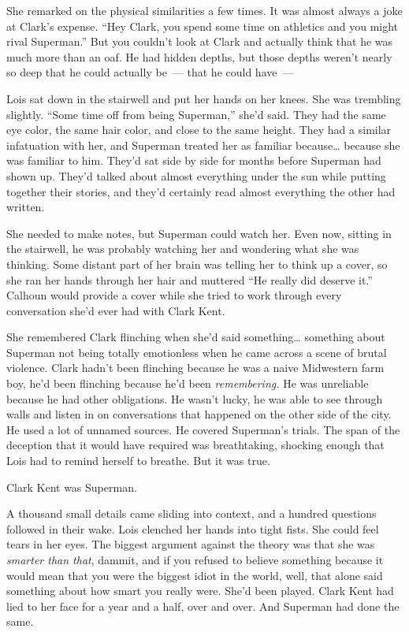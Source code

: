\documentclass[ebook,12pt]{memoir}
\begin{document}
She remarked on the physical similarities a few times. It was almost
always a joke at Clark's expense. ``Hey Clark, you spend some time on
athletics and you might rival Superman.'' But you couldn't look at Clark
and actually think that he was much more than an oaf. He had hidden
depths, but those depths weren't nearly so deep that he could actually
be~--- that he could have~---

Lois sat down in the stairwell and put her hands on her knees. She was
trembling slightly. ``Some time off from being Superman,'' she'd said.
They had the same eye color, the same hair color, and close to the same
height. They had a similar infatuation with her, and Superman treated
her as familiar because\ldots{} because she was familiar to him. They'd
sat side by side for months before Superman had shown up. They'd talked
about almost everything under the sun while putting together their
stories, and they'd certainly read almost everything the other had
written.

She needed to make notes, but Superman could watch her. Even now,
sitting in the stairwell, he was probably watching her and wondering
what she was thinking. Some distant part of her brain was telling her to
think up a cover, so she ran her hands through her hair and muttered
``He really did deserve it.'' Calhoun would provide a cover while she
tried to work through every conversation she'd ever had with Clark Kent.

She remembered Clark flinching when she'd said something\ldots{}
something about Superman not being totally emotionless when he came
across a scene of brutal violence. Clark hadn't been flinching because
he was a naive Midwestern farm boy, he'd been flinching because he'd
been \emph{remembering.} He was unreliable because he had other
obligations. He wasn't lucky, he was able to see through walls and
listen in on conversations that happened on the other side of the city.
He used a lot of unnamed sources. He covered Superman's trials. The span
of the deception that it would have required was breathtaking, shocking
enough that Lois had to remind herself to breathe. But it was true.

Clark Kent was Superman.

A thousand small details came sliding into context, and a hundred
questions followed in their wake. Lois clenched her hands into tight
fists. She could feel tears in her eyes. The biggest argument against
the theory was that she was \emph{smarter than that}, dammit, and if you
refused to believe something because it would mean that you were the
biggest idiot in the world, well, that alone said something about how
smart you really were. She'd been played. Clark Kent had lied to her
face for a year and a half, over and over. And Superman had done the
same.
\end{document}
